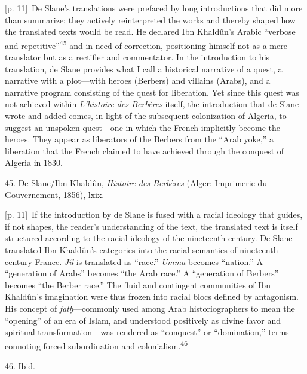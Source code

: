 \documentclass[10pt,a4paper]{article}
\begin{document}
{\scriptsize\color{gray} [p. 11]}\ De Slane’s translations were prefaced by long introductions that did more than summarize; they actively reinterpreted the works and thereby shaped how the translated texts would be read. He declared Ibn Khaldûn’s Arabic “verbose and repetitive”\nobreak\textsuperscript{45} and in need of correction, positioning himself not as a mere translator but as a rectifier and commentator. In the introduction to his translation, de Slane provides what I call a historical narrative of a quest, a narrative with a plot—with heroes (Berbers) and villains (Arabs), and a narrative program consisting of the quest for liberation. Yet since this quest was not achieved within \textit{L’histoire des Berbères} itself, the introduction that de Slane wrote and added comes, in light of the subsequent colonization of Algeria, to suggest an unspoken quest—one in which the French implicitly become the heroes. They appear as liberators of the Berbers from the “Arab yoke,” a liberation that the French claimed to have achieved through the conquest of Algeria in 1830.\par{\small 45. De Slane/Ibn Khaldûn, \textit{Histoire des Berbères} (Alger: Imprimerie du Gouvernement, 1856), lxix.\par}
{\scriptsize\color{gray} [p. 11]}\ If the introduction by de Slane is fused with a racial ideology that guides, if not shapes, the reader’s understanding of the text, the translated text is itself structured according to the racial ideology of the nineteenth century. De Slane translated Ibn Khaldûn’s categories into the racial semantics of nineteenth-century France. \textit{Jîl} is translated as “race.” \textit{Umma} becomes “nation.” A “generation of Arabs” becomes “the Arab race.” A “generation of Berbers” becomes “the Berber race.” The fluid and contingent communities of Ibn Khaldûn’s imagination were thus frozen into racial blocs defined by antagonism. His concept of \textit{fatḥ}—commonly used among Arab historiographers to mean the “opening” of an era of Islam, and understood positively as divine favor and spiritual transformation—was rendered as “conquest” or “domination,” terms connoting forced subordination and colonialism.\nobreak\textsuperscript{46}\par{\small 46. Ibid.\par}
\end{document}
